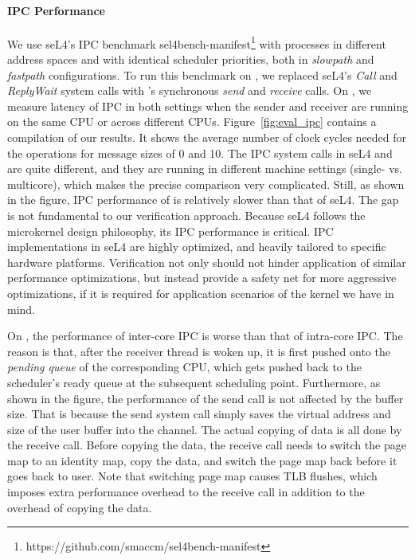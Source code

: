 \paragraph{IPC Performance}
We use seL4's IPC benchmark
sel4bench-manifest\footnote{https://github.com/smaccm/sel4bench-manifest}
with processes in different address spaces and with identical
scheduler priorities, both in \emph{slowpath} and \emph{fastpath}
configurations. To run this benchmark on {\cCTOS}, we replaced seL4's
\emph{Call} and \emph{ReplyWait} system calls with \cCTOS's
synchronous \emph{send} and \emph{receive} calls.  On {\cCTOS}, we
measure latency of IPC in both settings when the sender and receiver
are running on the same CPU or across different CPUs.
Figure~\ref{fig:eval_ipc} contains a compilation of our results. It
shows the average number of clock cycles needed for the operations for
message sizes of 0 and 10. The IPC system calls in seL4 and {\cCTOS}
are quite different, and they are running in different machine
settings (single- vs. multicore), which makes the precise
comparison very complicated.  Still, as shown in the figure, IPC
performance of {\cCTOS} is relatively slower than that of seL4. The
gap is not fundamental to our verification approach.  Because seL4
follows the microkernel design philosophy, its IPC performance is
critical. IPC implementations in seL4 are highly optimized, and
heavily tailored to specific hardware platforms.
Verification not only
should not hinder application of similar performance optimizations,
but instead provide a safety net for more aggressive optimizations, if
it is required for application scenarios of the kernel we have in
mind.

On {\cCTOS}, the performance of inter-core IPC is worse than that of
intra-core IPC.  The reason is that, after the receiver thread is
woken up, it is first pushed onto the \emph{pending queue} of the
corresponding CPU, which gets pushed back to the scheduler's ready
queue at the subsequent scheduling point. Furthermore, as shown in the
figure, the performance of the send call is not affected by the buffer
size. That is because the send system call simply saves the virtual
address and size of the user buffer into the channel.  The actual
copying of data is all done by the receive call.  Before copying the
data, the receive call needs to switch the page map to an identity
map, copy the data, and switch the page map back before it goes back
to user. Note that switching page map causes TLB flushes, which
imposes extra performance overhead to the receive call in addition to
the overhead of copying the data.


